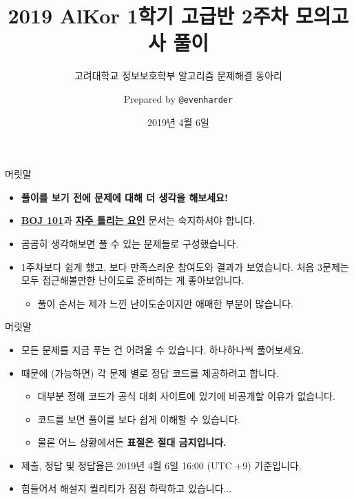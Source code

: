 \documentclass[hyperref={unicode}]{beamer}
\title[1학기 고급반 2주차 모의고사 풀이]{2019 AlKor 1학기 고급반 2주차 모의고사 풀이}
\subtitle{고려대학교 정보보호학부 알고리즘 문제해결 동아리}
\author[2019 AlKor]{Prepared by \texttt{@evenharder}}
\date{2019년 4월 6일}
\newcommand{\smallgray}{\footnotesize\color{gray}}
\theoremstyle{lemstyle}
\begin{document}
    
    \begin{frame}
        \titlepage
    \end{frame}
    
    \begin{frame}{머릿말}
        \begin{itemize}
            \item \textbf{풀이를 보기 전에 문제에 대해 더 생각을 해보세요!}
            \item {\bf \color{blue}\href{https://www.acmicpc.net/blog/view/55}{BOJ 101}}과 {\bf \color{blue}\href{https://www.acmicpc.net/blog/view/70}{자주 틀리는 요인}} 문서는 숙지하셔야 합니다.
            \item 곰곰히 생각해보면 풀 수 있는 문제들로 구성했습니다.
            \item 1주차보다 쉽게 했고, 보다 만족스러운 참여도와 결과가 보였습니다. 처음 3문제는 모두 접근해볼만한 난이도로 준비하는 게 좋아보입니다.
            \begin{itemize}
            \item 풀이 순서는 제가 느낀 난이도순이지만 애매한 부분이 많습니다.
            \end{itemize}
        \end{itemize}
    \end{frame}
    
    \begin{frame}{머릿말}
        \begin{itemize}
            \item 모든 문제를 지금 푸는 건 어려울 수 있습니다. 하나하나씩 풀어보세요.
            \item 때문에 (가능하면) 각 문제 별로 정답 코드를 제공하려고 합니다.
            \begin{itemize}
            \item 대부분 정해 코드가 공식 대회 사이트에 있기에 비공개할 이유가 없습니다.
            \item 코드를 보면 풀이를 보다 쉽게 이해할 수 있습니다.
            \item 물론 어느 상황에서든 \textbf{표절은 절대 금지입니다.}
            \end{itemize}
            \item 제출, 정답 및 정답율은 2019년 4월 6일 16:00 (UTC +9) 기준입니다.
            \item {\smallgray 힘들어서 해설지 퀄리티가 점점 하락하고 있습니다...}
        \end{itemize}
    \end{frame}
\end{document}
